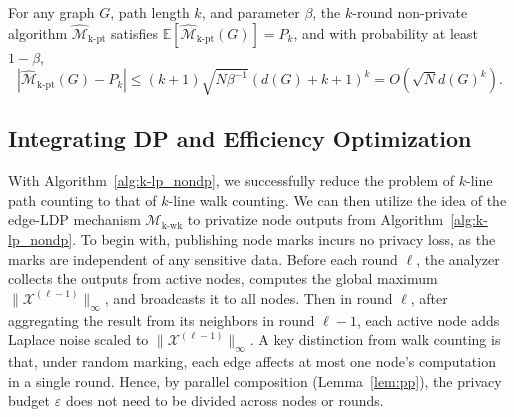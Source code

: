 \begin{lemma}
\label{lem:k-lp_sampling_bound}
For any graph $G$, path length $k$, and parameter $\beta$, 
the $k$-round non-private algorithm $\widehat{\mathcal{M}}_{\mathrm{k\text{-}pt}}$ satisfies $
    \mathbb{E}[\widehat{\mathcal{M}}_{\mathrm{k\text{-}pt}}(G)] = P_k $,
and with probability at least $1 - \beta$,
\begin{equation*}
    |\widehat{\mathcal{M}}_{\mathrm{k\text{-}pt}}(G)-P_k| \leq
    (k+1) \sqrt{N\beta^{-1}}(d(G)+k+1)^k
    = O(\sqrt{N} d(G)^k).
\end{equation*}
\end{lemma}










\subsection{Integrating DP and Efficiency Optimization}
\label{subsec:k-lp_dp}





With Algorithm~\ref{alg:k-lp_nondp}, we successfully reduce the problem of $k$-line path counting to that of $k$-line walk counting. 
We can then utilize the idea of the edge-LDP mechanism $\mathcal{M}_{\mathrm{k\text{-}wk}}$ to privatize node outputs from Algorithm~\ref{alg:k-lp_nondp}.
To begin with, publishing node marks incurs no privacy loss, as the marks are independent of any sensitive data.
Before each round $\ell$, the analyzer collects the outputs from active nodes, computes the global maximum $\|\mathcal{X}^{(\ell-1)}\|_\infty$, and broadcasts it to all nodes.
Then in round $\ell$, after aggregating the result from its neighbors in round $\ell-1$, each active node adds Laplace noise scaled to $\|\mathcal{X}^{(\ell-1)}\|_\infty$.
A key distinction from walk counting is that, under random marking, each edge affects at most one node’s computation in a single round. 
Hence, by parallel composition (Lemma~\ref{lem:pp}), the privacy budget $\varepsilon$ does not need to be divided across nodes or rounds. 



